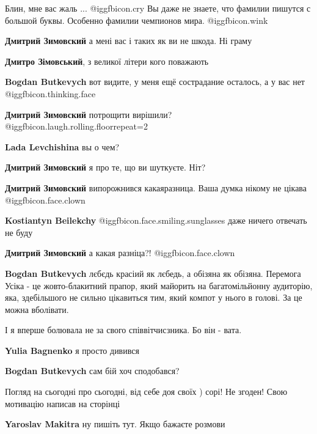 \begin{itemize}
Блин, мне вас жаль ... @igg{fbicon.cry} Вы даже не знаете, что фамилии пишутся с большой буквы.
Особенно фамилии чемпионов мира.  @igg{fbicon.wink} 

\begin{itemize} %
\textbf{Дмитрий Зимовский} а мені вас і таких як ви не шкода. Ні граму

\textbf{Дмитро Зімовський}, з великої літери кого поважають

\textbf{Bogdan Butkevych} вот видите, у меня ещё сострадание осталось, а у вас нет  @igg{fbicon.thinking.face} 

\textbf{Дмитрий Зимовский} потрощити вирішили?  @igg{fbicon.laugh.rolling.floor}{repeat=2} 

\textbf{Lada Levchishina} вы о чем?

\textbf{Дмитрий Зимовский} я про те, що ви шуткуєте. Ніт?

\textbf{Дмитрий Зимовский} випорожнився какаяразница.
Ваша думка нікому не цікава @igg{fbicon.face.clown} 

\textbf{Kostiantyn Beilekchy}  @igg{fbicon.face.smiling.sunglasses}  даже ничего отвечать не буду

\textbf{Дмитрий Зимовский} а какая разніца?! @igg{fbicon.face.clown} 
\end{itemize} %

\textbf{Bogdan Butkevych} лєбєдь красіий як лєбедь, а обізяна як обізяна.
Перемога Усіка - це жовто-блакитний прапор, який майорить на багатомільйонну аудиторію, яка, здебільшого не сильно цікавиться тим, який компот у нього в голові. За це можна вболівати.

І я вперше болювала не за свого співвітчисзника. Бо він - вата.

\begin{itemize} %
\textbf{Yulia Bagnenko} я просто дивився

\textbf{Bogdan Butkevych} сам бій хоч сподобався?
\end{itemize} %


Погляд на сьогодні про сьогодні, від себе доя своїх ) сорі! Не згоден! Свою
мотивацію написав на сторінці

\begin{itemize} %
\textbf{Yaroslav Makitra} ну пишіть тут. Якщо бажаєте розмови


\end{itemize}
\end{itemize}
